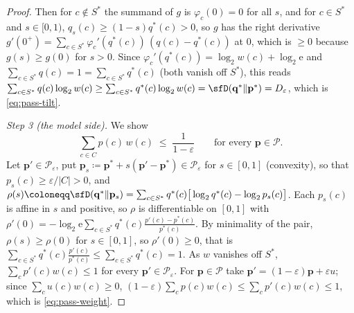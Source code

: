 \begin{proof}
Then for $c\notin S^{*}$ the summand of $g$ is $\varphi_c(0)=0$ for all $s$, and
for $c\in S^{*}$ and $s\in[0,1)$, $q_s(c)\ge(1-s)q^{*}(c)>0$, so $g$ has the
right derivative
$g'(0^{+})=\sum_{c\in S^{*}}\varphi_c'(q^{*}(c))\,(q(c)-q^{*}(c))$ at $0$, which is
$\ge0$ because $g(s)\ge g(0)$ for $s>0$. Since $\varphi_c'(q^{*}(c))
=\log_2w(c)+\log_2\mathrm e$ and $\sum_{c\in S^{*}}q(c)=1=\sum_{c\in S^{*}}q^{*}(c)$
(both vanish off $S^{*}$), this reads
$\sum_{c\in S^{*}}q(c)\log_2w(c)\ge\sum_{c\in S^{*}}q^{*}(c)\log_2w(c)
=\sfD(\mathbf q^{*}\|\mathbf p^{*})=D_{\varepsilon}$, which is
\eqref{eq:pass-tilt}.

\emph{Step 3 (the model side).} We show
\begin{equation}\label{eq:pass-weight}
  \sum_{c\in C}p(c)\,w(c)\;\le\;\frac{1}{1-\varepsilon}
  \qquad\text{for every }\mathbf p\in\mathcal{P}.
\end{equation}
Let $\mathbf p'\in\mathcal{P}_{\varepsilon}$, put
$\mathbf p_s\coloneqq\mathbf p^{*}+s(\mathbf p'-\mathbf p^{*})\in
\mathcal{P}_{\varepsilon}$ for $s\in[0,1]$ (convexity), so that
$p_s(c)\ge\varepsilon/|C|>0$, and
$\rho(s)\coloneqq\sfD(\mathbf q^{*}\|\mathbf p_s)
=\sum_{c\in S^{*}}q^{*}(c)\big[\log_2q^{*}(c)-\log_2p_s(c)\big]$. Each $p_s(c)$ is
affine in $s$ and positive, so $\rho$ is differentiable on $[0,1]$ with
$\rho'(0)=-\log_2\mathrm e\sum_{c\in S^{*}}q^{*}(c)\frac{p'(c)-p^{*}(c)}{p^{*}(c)}$.
By minimality of the pair, $\rho(s)\ge\rho(0)$ for $s\in[0,1]$, so $\rho'(0)\ge0$,
that is $\sum_{c\in S^{*}}q^{*}(c)\frac{p'(c)}{p^{*}(c)}\le\sum_{c\in S^{*}}q^{*}(c)=1$.
As $w$ vanishes off $S^{*}$, $\sum_cp'(c)w(c)\le1$ for every
$\mathbf p'\in\mathcal{P}_{\varepsilon}$. For $\mathbf p\in\mathcal{P}$ take
$\mathbf p'=(1-\varepsilon)\mathbf p+\varepsilon u$; since
$\sum_cu(c)w(c)\ge0$, $(1-\varepsilon)\sum_cp(c)w(c)\le\sum_cp'(c)w(c)\le1$,
which is \eqref{eq:pass-weight}.


\end{proof}

